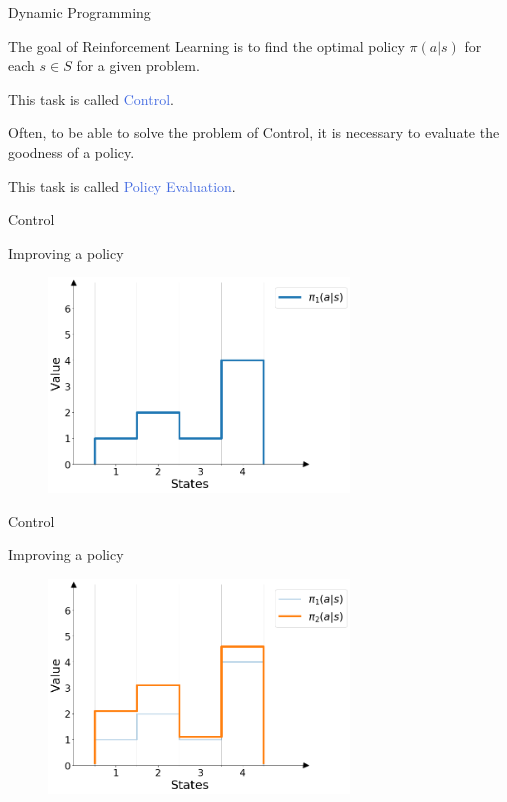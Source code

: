 \documentclass{beamer}
\begin{document}
\begin{frame}{Dynamic Programming}

The goal of Reinforcement Learning is to find the optimal policy $\pi(a|s)$ for each $s \in S$ for a given problem. 

This task is called \textcolor{RoyalBlue}{Control}.

\vspace{3mm}

Often, to be able to solve the problem of Control, it is necessary to evaluate the goodness of a policy.

This task is called \textcolor{RoyalBlue}{Policy Evaluation}.

\end{frame}




\begin{frame}{Control}

Improving a policy

\begin{figure}[t]
\includegraphics[width=8cm]{./images/pi1.png}
\centering
\end{figure}

\end{frame}


\begin{frame}{Control}

Improving a policy

\begin{figure}[t]
\includegraphics[width=8cm]{./images/pi2.png}
\centering
\end{figure}

\end{frame}
\end{document}
